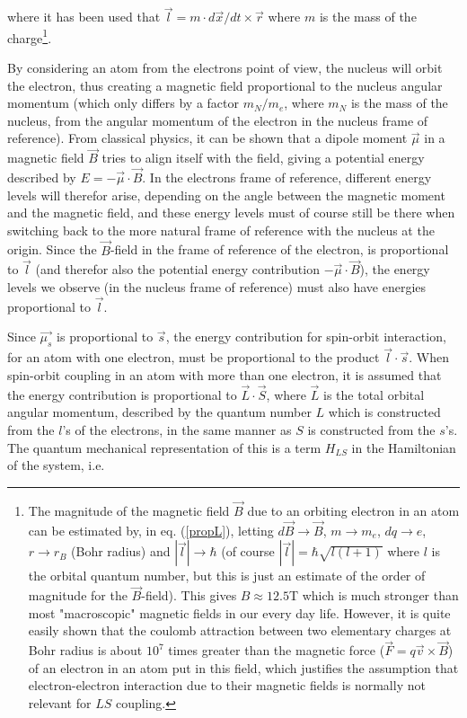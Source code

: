 \documentclass[a4paper]{article}
\begin{document}
where it has been used that $\vec{l}=m \cdot d\vec{x}/dt \times \vec{r}$ where $m$ is the mass of the charge\footnote{The magnitude of the magnetic field $\vec{B}$ due to an orbiting electron in an atom can be estimated by, in eq. (\ref{propL}), letting $d\vec{B}\rightarrow \vec{B}$, $m\rightarrow m_e$, $dq \rightarrow e$, $r \rightarrow r_B$ (Bohr radius) and $|\vec{l}|\rightarrow \hbar$ (of course $|\vec{l}|=\hbar \sqrt{l(l+1)}$ where $l$ is the orbital quantum number, but this is just an estimate of the order of magnitude for the $\vec{B}$-field). This gives $B \approx 12.5$T which is much stronger than most "macroscopic" magnetic fields in our every day life. However, it is quite easily shown that the coulomb attraction between two elementary charges at Bohr radius is about $10^7$ times greater than the magnetic force ($\vec{F}=q\vec{v}\times \vec{B}$) of an electron in an atom put in this field, which justifies the assumption that electron-electron interaction due to their magnetic fields is normally not relevant for $LS$ coupling.}.

By considering an atom from the electrons point of view, the nucleus will orbit the electron, thus creating a magnetic field proportional to the nucleus angular momentum (which only differs by a factor $m_N/m_e$, where $m_N$ is the mass of the nucleus, from the angular momentum of the electron in the nucleus frame of reference). From classical physics, it can be shown that a dipole moment $\vec{\mu}$ in a magnetic field $\vec{B}$ tries to align itself with the field, giving a potential energy described by $E=-\vec{\mu}\cdot\vec{B}$. In the electrons frame of reference, different energy levels will therefor arise, depending on the angle between the magnetic moment and the magnetic field, and these energy levels must of course still be there when switching back to the more natural frame of reference with the nucleus at the origin. Since the $\vec{B}$-field in the frame of reference of the electron, is proportional to $\vec{l}$ (and therefor also the potential energy contribution $-\vec{\mu}\cdot\vec{B}$), the energy levels we observe (in the nucleus frame of reference) must also have energies proportional to $\vec{l}$.

Since $\vec{\mu_s}$ is proportional to $\vec{s}$, the energy contribution for spin-orbit interaction, for an atom with one electron, must be proportional to the product $\vec{l} \cdot \vec{s}$. When spin-orbit coupling in an atom with more than one electron, it is assumed that the energy contribution is proportional to $\vec{L}\cdot\vec{S}$, where $\vec{L}$ is the total orbital angular momentum, described by the quantum number $L$ which is constructed from the $l$'s of the electrons, in the same manner as $S$ is constructed from the $s$'s. The quantum mechanical representation of this is a term $H_{LS}$ in the Hamiltonian of the system, i.e.
\end{document}
